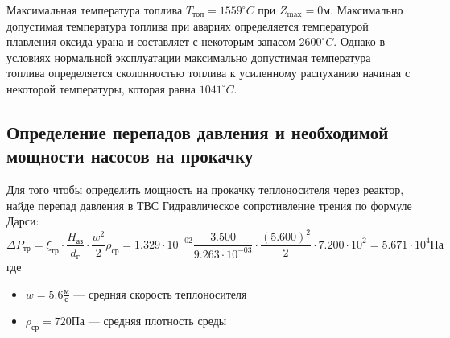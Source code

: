 Максимальная температура топлива $T_{\text{топ}} = 1559 ^\circ C$ при $Z_{\text{max}} = 0 \text{м}$. Максимально допустимая температура топлива при авариях определяется температурой плавления оксида урана и составляет с некоторым запасом $2600 ^\circ C$. Однако в условиях нормальной эксплуатации максимально допустимая температура топлива определяется сколонностью топлива к усиленному распуханию начиная с некоторой температуры, которая равна $1041 ^\circ C$.

\subsection{Определение перепадов давления и необходимой мощности насосов на прокачку}
Для того чтобы определить мощность на прокачку теплоносителя через реактор, найде перепад давления в ТВС
\noindent Гидравлическое сопротивление трения по формуле Дарси:
$$
\Delta P_{\text{тр}}=\xi_{\text{тр}}\cdot\frac{H_{\text{аз}}}{d_{\text{г}}}\cdot \frac {w^2}{2}\rho_{\text{ср}}
=
1.329 \cdot 10^{ -02 } \frac {3.500 } {9.263 \cdot 10^{ -03 }} \cdot \frac {(5.600 )^2} {2} \cdot 7.200 \cdot 10^{ 2 }
=5.671 \cdot 10^{ 4 } \text{Па}
$$
где 
\begin{itemize}
\item $w = 5.6 \frac{\text{м}}{\text{с}}$ — средняя скорость теплоносителя
\item $\rho_{\text{ср}} = 720 \text{Па}$ — средняя плотность среды
\end{itemize}


